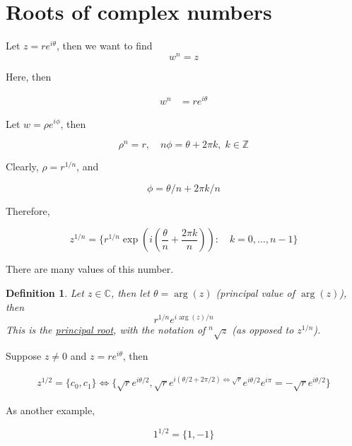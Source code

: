 \documentclass{article}
\newtheorem{definition}[theorem]{Definition}
\newtheorem{one minute paper}[theorem]{One Minute Paper}
\begin{document}
\section*{Roots of complex numbers}

Let $z = re^{i\theta}$, then we want to find 
\begin{equation}
    w^n = z
\end{equation}

Here, then 

\begin{align}
    w^n &= re^{i\theta}
\end{align}

Let $w = \rho e^{i\phi}$, then 

\begin{equation}
    \rho^n = r, \quad n\phi = \theta + 2\pi k,\; k \in \mathbb{Z}
\end{equation}

Clearly, $\rho = r^{1/n}$, and 

\begin{equation}
    \phi = \theta/n + 2\pi k/n
\end{equation}

Therefore, 

\begin{equation}
    z^{1/n} = \{r^{1/n} \exp(i(\frac{\theta}{n} + \frac{2\pi k}{n})): \quad k = 0, \dots, n-1\}
\end{equation}

There are many values of this number.

\begin{definition}
    Let $z \in \mathbb{C}$, then let $\theta = \arg(z)$ (principal value of $\arg(z)$), then 
    \begin{equation}
        r^{1/n}e^{i\arg(z)/n}
    \end{equation}
    This is the \underline{principal root}, with the notation of $^n\sqrt{z}$ (as opposed to $z^{1/n}$). 
\end{definition}

Suppose $z \neq 0$ and $z = re^{i\theta}$, then 

\begin{align}
    z^{1/2} = \{c_0, c_1\} \iff \{\sqrt{r}e^{i\theta/2}, \sqrt{r}e^{i(\theta/2 + 2\pi/2) \iff \sqrt{r}}e^{i\theta/2}e^{i\pi} = -\sqrt{r}e^{i\theta/2}\}
\end{align}

As another example, 

\begin{equation}
    1^{1/2} = \{1, -1\}
\end{equation}
\end{document}
